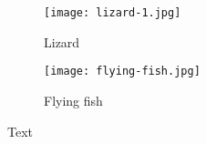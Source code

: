 


\begin{figure}[t]%
    \centering
    \begin{subfigure}{.47\textwidth}
        \centering
        \texttt{[image: lizard-1.jpg]}
        \caption{Lizard}
        \label{fig:tiling_three}
    \end{subfigure}\quad
    \begin{subfigure}{.47\textwidth}
        \centering
        \texttt{[image: flying-fish.jpg]}
        \caption{Flying fish}
        \label{fig:tiling_four}
    \end{subfigure}
    \caption{Text}
    \label{fig:tilingsss_two}
\end{figure}